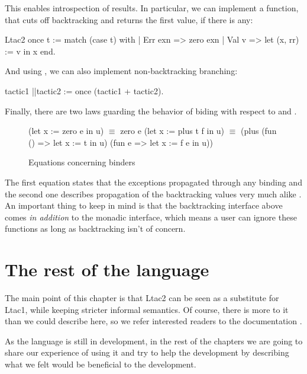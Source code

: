 This enables introspection of results.
In particular, we can implement a function, that cuts off backtracking and returns the first value, if there is any:
\begin{coq}
Ltac2 once t := match (case t) with
  | Err exn => zero exn
  | Val v => let (x, rr) := v in x
  end.
\end{coq}

And using , we can also implement non-backtracking branching:
\begin{coq}
tactic1 ||tactic2 := once (tactic1 + tactic2).
\end{coq}

Finally, there are two laws guarding the behavior of biding with respect to  and .
\begin{figure}[H]
\begin{coq}
(let x := zero e in u) $\equiv$ zero e
(let x := plus t f in u) $\equiv$ (plus (fun () => let x := t in u)
                                 (fun e => let x := f e in u))
\end{coq}
\caption{Equations concerning binders}
\label{fig:let_eq}
\end{figure}

The first equation states that the exceptions propagated through any binding and the second one describes propagation of the backtracking values very much alike .
An important thing to keep in mind is that the backtracking interface above comes \emph{in addition} to the monadic interface, which means a user can ignore these functions as long as backtracking isn't of concern.

\section{The rest of the language}
The main point of this chapter is that Ltac2 can be seen as a substitute for Ltac1, while keeping stricter informal semantics.
Of course, there is more to it than we could describe here, so we refer interested readers to the documentation \cite[Section 3.3.2]{thecoqdevelopmentteamCoqProofAssistant2020}.

As the language is still in development, in the rest of the chapters we are going to share our experience of using it and try to help the development by describing what we felt would be beneficial to the development.

